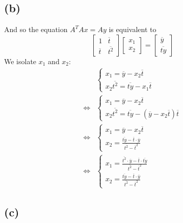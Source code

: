 \documentclass{article}
\newcommand{\ol}{\overline}
\begin{document}
\subsection*{(b)}

And so the equation $A^TAx = Ay$ is equivalent to
\begin{equation*}
	\begin{bmatrix}
		1 & \ol{t} \\
		\ol{t} & \ol{t^2}
	\end{bmatrix}
	\begin{bmatrix}
		x_1 \\
		x_2
	\end{bmatrix}
	=
	\begin{bmatrix}
		\ol{y}\\
		\ol{ty}
	\end{bmatrix}
\end{equation*}
We isolate $x_1$ and $x_2$:
\begin{align*}
	&	
		\begin{cases}
			x_1 = \ol{y} - x_2\ol{t} \\
			x_2\ol{t^2} = \ol{ty} - x_1\ol{t}
		\end{cases}\\
	\iff &
		\begin{cases}
			x_1 = \ol{y} - x_2\ol{t} \\
			x_2\ol{t^2} = \ol{ty} - (\ol{y} - x_2\ol{t})\ol{t}
		\end{cases}\\
	\iff & 
		\begin{cases}	
			x_1 = \ol{y} - x_2\ol{t} \\
			x_2 = \frac{\ol{ty} - \ol{t}\cdot\ol{y}}{\ol{t^2} 
			- \ol{t}^2}
		\end{cases}\\
	\iff &
		\begin{cases}
			x_1 = \frac{\ol{t^2}\cdot\ol{y} - \ol{t}\cdot\ol{ty}}
			{\ol{t^2} - \ol{t}^2} \\
			x_2 = \frac{\ol{ty} - \ol{t}\cdot\ol{y}}{\ol{t^2}
			- \ol{t}^2}
		\end{cases}
\end{align*}

\subsection*{(c)}
\end{document}
